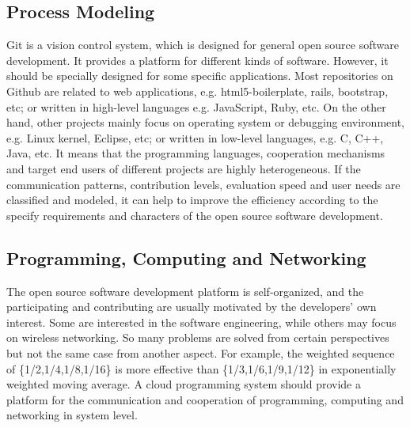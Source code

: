 \documentclass[draftclsnofoot,journal,onecolumn,12pt]{IEEEtran}
\begin{document}
\subsection{Process Modeling}
Git is a vision control system, which is designed for general open source software development. It provides a platform for different kinds of software. However, it should be specially designed for some specific applications. Most repositories on Github are related to web applications, e.g. html5-boilerplate, rails, bootstrap, etc; or written in high-level languages e.g. JavaScript, Ruby, etc. On the other hand, other projects mainly focus on operating system or debugging environment, e.g. Linux kernel, Eclipse, etc; or written in low-level languages, e.g. C, C++, Java, etc. It means that the programming languages, cooperation mechanisms and target end users of different projects are highly heterogeneous. If the communication patterns, contribution levels, evaluation speed and user needs are classified and modeled, it can help to improve the efficiency according to the specify requirements and characters of the open source software development.
%

\subsection{Programming, Computing and Networking}

The open source software development platform is self-organized, and the participating and contributing are usually motivated by the developers' own interest. Some are interested in the software engineering, while others may focus on wireless networking. So many problems are solved from certain perspectives but not the same case from another aspect. For example, the weighted sequence of \{1/2,1/4,1/8,1/16\} is more effective than \{1/3,1/6,1/9,1/12\} in exponentially weighted moving average. A cloud programming system should provide a platform for the communication and cooperation of programming, computing and networking in system level.
\end{document}
